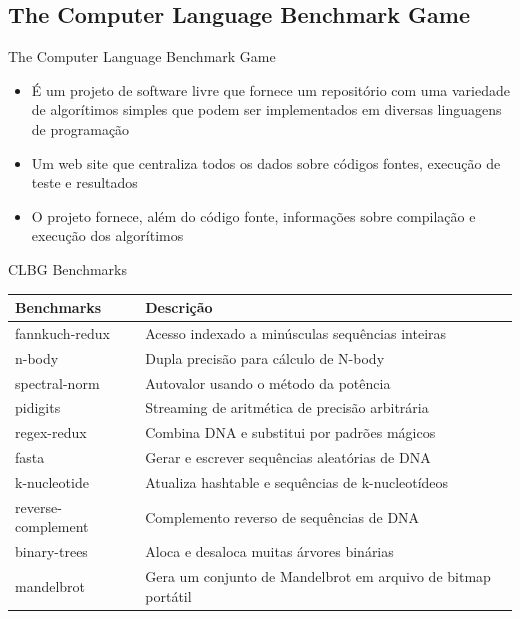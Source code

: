 \subsection{The Computer Language Benchmark Game}
\begin{frame}{The Computer Language Benchmark Game}
    \begin{itemize}
        \item É um projeto de software livre que fornece um repositório com uma variedade de algorítimos simples que podem ser implementados em diversas linguagens de programação
        \item Um web site que centraliza todos os dados sobre códigos fontes, execução de teste e resultados
        \item O projeto fornece, além do código fonte, informações sobre compilação e execução dos algorítimos
    \end{itemize}
\end{frame}
\begin{frame}{CLBG Benchmarks}
	\centering
	
	\label{tbl:clbg_benchmarks}
	\begin{table}[h]
        \begin{tabular}{l|l}
        \textbf{Benchmarks} & \textbf{Descrição}   \\
        \hline
		fannkuch-redux      & Acesso indexado a minúsculas sequências inteiras            \\
		\hline
        n-body              & Dupla precisão para cálculo de N-body                       \\
		\hline
        spectral-norm       & Autovalor usando o método da potência                       \\
		\hline
        pidigits            & Streaming de aritmética de precisão arbitrária             \\
		\hline
        regex-redux         & Combina DNA e substitui por padrões mágicos                 \\
		\hline
        fasta               & Gerar e escrever sequências aleatórias de DNA               \\
		\hline
        k-nucleotide        & Atualiza hashtable e sequências de k-nucleotídeos           \\
		\hline
        reverse-complement  & Complemento reverso de sequências de DNA                     \\
		\hline
        binary-trees        & Aloca e desaloca muitas árvores binárias                    \\
		\hline
        mandelbrot          & Gera um conjunto de Mandelbrot em arquivo de bitmap portátil \\
    \end{tabular}
	\end{table}
\end{frame}

